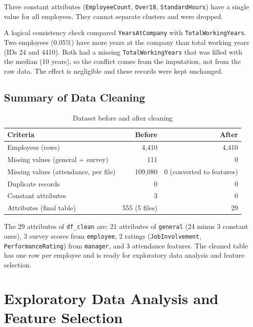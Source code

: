 \documentclass[12pt,a4paper]{article}
\begin{document}
Three constant attributes (\texttt{EmployeeCount}, \texttt{Over18},
\texttt{StandardHours}) have a single value for all employees. They cannot
separate clusters and were dropped.

A logical consistency check compared \texttt{YearsAtCompany} with
\texttt{TotalWorkingYears}. Two employees (0.05\%) have more years at the
company than total working years (IDs 24 and 4410). Both had a missing
\texttt{TotalWorkingYears} that was filled with the median (10 years), so the
conflict comes from the imputation, not from the raw data. The effect is
negligible and these records were kept unchanged.

\subsection{Summary of Data Cleaning}

\begin{table}[H]
\centering
\caption{Dataset before and after cleaning}
\label{tab:cleaning-summary}
\begin{tabular}{lrr}
\toprule
\textbf{Criteria} & \textbf{Before} & \textbf{After}\\
\midrule
Employees (rows)                      & 4,410 & 4,410\\
Missing values (general + survey)     & 111   & 0\\
Missing values (attendance, per file) & 109,080 & 0 (converted to features)\\
Duplicate records                     & 0     & 0\\
Constant attributes                   & 3     & 0\\
Attributes (final table)              & 555 (5 files) & 29\\
\bottomrule
\end{tabular}
\end{table}

The 29 attributes of \texttt{df\_clean} are: 21 attributes of
\texttt{general} (24 minus 3 constant ones), 3 survey scores from
\texttt{employee}, 2 ratings (\texttt{JobInvolvement},
\texttt{PerformanceRating}) from \texttt{manager}, and 3 attendance
features. The cleaned table has one row per employee and is ready for
exploratory data analysis and feature selection.

\section{Exploratory Data Analysis and Feature Selection}
\label{sec:eda-fs}
\end{document}
